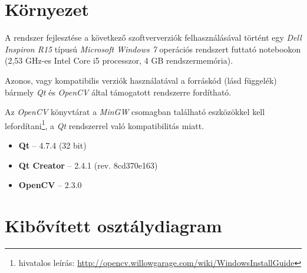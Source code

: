 \section{Környezet}\label{sect:telepites}

A rendszer fejlesztése a következő szoftververziók felhasználásával történt egy \emph{Dell Inspiron R15} típusú \emph{Microsoft Windows 7} operációs rendszert futtató notebookon (2,53 GHz-es Intel Core i5 processzor, 4 GB rendszermemória).

Azonos, vagy kompatibilis verziók használatával a forráskód (lásd  függelék) bármely \emph{Qt} és \emph{OpenCV} által támogatott rendszerre fordítható.

Az \emph{OpenCV} könyvtárat a \emph{MinGW} csomagban található eszközökkel kell lefordítani\footnote{hivatalos leírás: \url{http://opencv.willowgarage.com/wiki/WindowsInstallGuide}}, a \emph{Qt} rendszerrel való kompatibilitás miatt.  

\begin{itemize}
  \item \textbf{Qt} -- 4.7.4 (32 bit)
  \item \textbf{Qt Creator} -- 2.4.1 (rev. 8cd370e163)
  \item \textbf{OpenCV} -- 2.3.0
\end{itemize}

\newpage
\section{Kibővített osztálydiagram}\label{sect:osztalydiagram}

